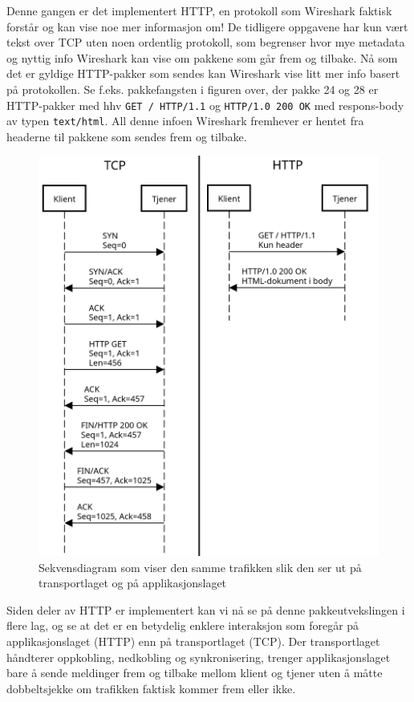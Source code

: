 \documentclass{article}
\begin{document}
Denne gangen er det implementert HTTP, en protokoll som Wireshark faktisk forstår og kan vise noe mer informasjon om! De tidligere oppgavene har kun vært tekst over TCP uten noen ordentlig protokoll, som begrenser hvor mye metadata og nyttig info Wireshark kan vise om pakkene som går frem og tilbake. Nå som det er gyldige HTTP-pakker som sendes kan Wireshark vise litt mer info basert på protokollen. Se f.eks. pakkefangsten i figuren over, der pakke 24 og 28 er HTTP-pakker med hhv \texttt{GET / HTTP/1.1} og \texttt{HTTP/1.0 200 OK} med respons-body av typen \texttt{text/html}. All denne infoen Wireshark fremhever er hentet fra headerne til pakkene som sendes frem og tilbake.

\begin{figure}
    \centering
    \includegraphics[width=.8\linewidth]{illustrasjoner/P3-web-sekvens.png}
    \caption{Sekvensdiagram som viser den samme trafikken slik den ser ut på transportlaget og på applikasjonslaget}
\end{figure}

Siden deler av HTTP er implementert kan vi nå se på denne pakkeutvekslingen i flere lag, og se at det er en betydelig enklere interaksjon som foregår på applikasjonslaget (HTTP) enn på transportlaget (TCP).
Der transportlaget håndterer oppkobling, nedkobling og synkronisering, trenger applikasjonslaget bare å sende meldinger frem og tilbake mellom klient og tjener uten å måtte dobbeltsjekke om trafikken faktisk kommer frem eller ikke.
\end{document}
